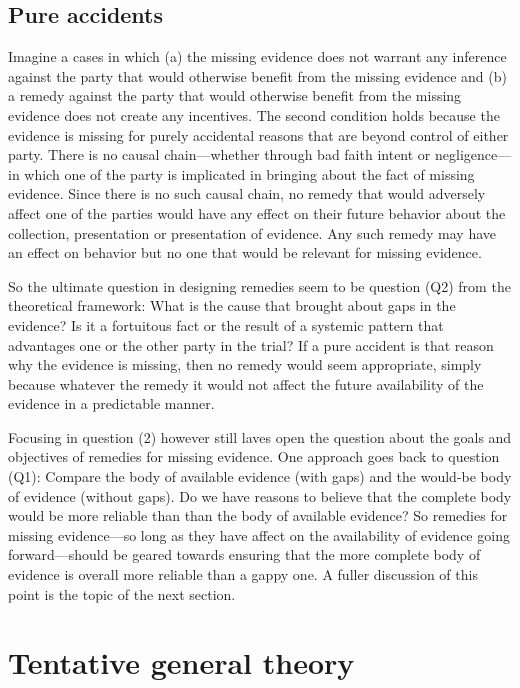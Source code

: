 \documentclass[
  10pt,
  dvipsnames,enabledeprecatedfontcommands]{scrartcl}
\begin{document}
\hypertarget{pure-accidents}{%
\subsection{Pure accidents}\label{pure-accidents}}

Imagine a cases in which (a) the missing evidence does not warrant any
inference against the party that would otherwise benefit from the
missing evidence and (b) a remedy against the party that would otherwise
benefit from the missing evidence does not create any incentives. The
second condition holds because the evidence is missing for purely
accidental reasons that are beyond control of either party. There is no
causal chain---whether through bad faith intent or negligence---in which
one of the party is implicated in bringing about the fact of missing
evidence. Since there is no such causal chain, no remedy that would
adversely affect one of the parties would have any effect on their
future behavior about the collection, presentation or presentation of
evidence. Any such remedy may have an effect on behavior but no one that
would be relevant for missing evidence.

So the ultimate question in designing remedies seem to be question (Q2)
from the theoretical framework: What is the cause that brought about
gaps in the evidence? Is it a fortuitous fact or the result of a
systemic pattern that advantages one or the other party in the trial? If
a pure accident is that reason why the evidence is missing, then no
remedy would seem appropriate, simply because whatever the remedy it
would not affect the future availability of the evidence in a
predictable manner.

Focusing in question (2) however still laves open the question about the
goals and objectives of remedies for missing evidence. One approach goes
back to question (Q1): Compare the body of available evidence (with
gaps) and the would-be body of evidence (without gaps). Do we have
reasons to believe that the complete body would be more reliable than
than the body of available evidence? So remedies for missing
evidence---so long as they have affect on the availability of evidence
going forward---should be geared towards ensuring that the more complete
body of evidence is overall more reliable than a gappy one. A fuller
discussion of this point is the topic of the next section.

\hypertarget{tentative-general-theory}{%
\section{Tentative general theory}\label{tentative-general-theory}}
\end{document}

